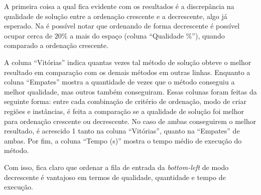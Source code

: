 A primeira coisa a qual fica evidente com os resultados é a discrepância na qualidade de solução
entre a ordenação crescente e a decrescente, algo já esperado.
Na  é possível notar que ordenando de forma decrescente é possível ocupar
cerca de $20\%$ a mais do espaço (coluna “Qualidade \%”), quando comparado a ordenação crescente.



A coluna “Vitórias” indica quantas vezes tal método de solução obteve o melhor resultado em
comparação com os demais métodos em outras linhas.
Enquanto a coluna “Empates” mostra a quantidade de vezes que o método conseguiu a melhor qualidade,
mas outros também conseguiram.
Essas colunas foram feitas da seguinte forma: entre cada combinação de critério de ordenação,
modo de criar regiões e instâncias, é feita a comparação se a qualidade de solução foi melhor
para ordenação crescente ou decrescente.
No caso de ambas conseguirem o melhor resultado, é acrescido 1 tanto na coluna “Vitórias”, quanto
na “Empates” de ambas.
Por fim, a coluna “Tempo (s)” mostra o tempo médio de execução do método.

Com isso, fica claro que ordenar a fila de entrada da \textit{bottom-left} de modo decrescente é
vantajoso em termos de qualidade, quantidade e tempo de execução.